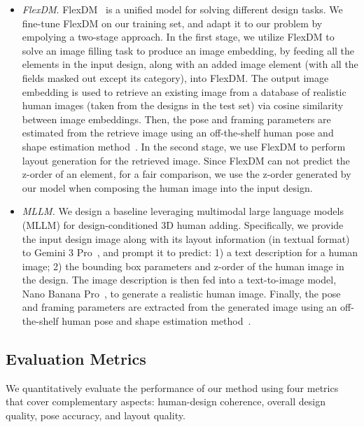 \begin{itemize}
    \item \textit{FlexDM}. FlexDM~\cite{flexdm} is a unified model for solving different design tasks.
    We fine-tune FlexDM on our training set, 
    and adapt it to our problem by empolying a two-stage approach. In the first stage, we utilize FlexDM to solve an image filling task to produce an image embedding, by feeding all the elements in the input design, along with an added image element (with all the fields masked out except its category), into FlexDM. The output image embedding is used to retrieve an existing image from a database of realistic human images (taken from the designs in the test set) 
    via cosine similarity between image embeddings. Then, the pose and framing parameters are estimated from the retrieve image using an off-the-shelf human pose and shape estimation method~\cite{aios}.
    In the second stage, we use FlexDM to perform layout generation for the retrieved image.
    Since FlexDM can not predict the z-order of an element, for a fair comparison, we use the z-order generated by our model when composing the human image into the input design. 

    \item \textit{MLLM.} We design a baseline leveraging multimodal large language models (MLLM) for 
    design-conditioned 3D human adding.
    Specifically, we provide the input design image along with its layout information (in textual format) to Gemini 3 Pro~\cite{geminiteam2023gemini}, and prompt it to predict: 1) a text description for a human image; 2) the bounding box parameters and z-order of the human image in the design. The image description is then fed into a text-to-image model, Nano Banana Pro~\cite{google2025nanobanana}, to generate a realistic human image.
    Finally, the pose and framing parameters are extracted from the generated image using an off-the-shelf human pose and shape estimation method~\cite{aios}.
\end{itemize}

\subsection{Evaluation Metrics}
We quantitatively evaluate the performance of our method using four metrics that cover complementary aspects: human-design coherence, overall design quality, pose accuracy, and layout quality.

